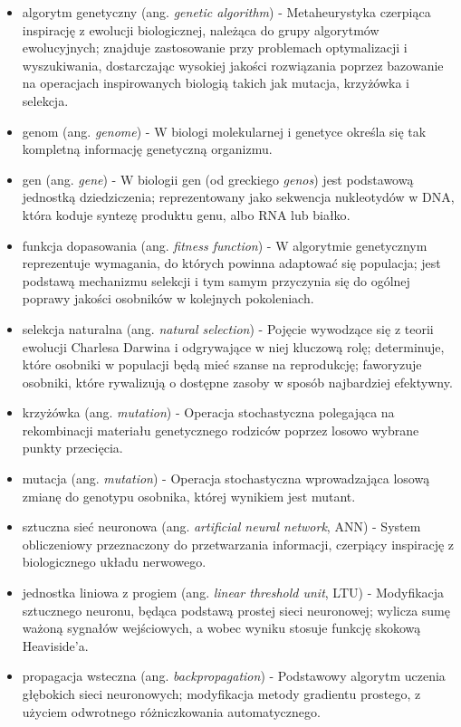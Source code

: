 \documentclass[a4paper,11pt]{article}
\begin{document}
    \begin{itemize}
        \item algorytm genetyczny (ang. \textit{genetic algorithm}) - Metaheurystyka czerpiąca inspirację z ewolucji biologicznej, należąca do grupy algorytmów ewolucyjnych; znajduje zastosowanie przy problemach optymalizacji i wyszukiwania, dostarczając wysokiej jakości rozwiązania poprzez bazowanie na operacjach inspirowanych biologią takich jak mutacja, krzyżówka i selekcja\cite{GeneticAlgorithmsMitchell1996}.
        \item genom (ang. \textit{genome}) - W biologi molekularnej i genetyce określa się tak kompletną informację genetyczną organizmu\cite{WhatIsGenomicMedicine2019}.
        \item gen (ang. \textit{gene}) - W biologii gen (od greckiego \textit{genos}) jest podstawową jednostką dziedziczenia; reprezentowany jako sekwencja nukleotydów w DNA, która koduje syntezę produktu genu, albo RNA lub białko\cite{GeneWiki}.
        \item funkcja dopasowania (ang. \textit{fitness function}) - W algorytmie genetycznym reprezentuje wymagania, do których powinna adaptować się populacja; jest podstawą mechanizmu selekcji i tym samym przyczynia się do ogólnej poprawy jakości osobników w kolejnych pokoleniach\cite{IntroductionToEvolutionaryComputing2015}.
        \item selekcja naturalna (ang. \textit{natural selection}) - Pojęcie wywodzące się z teorii ewolucji Charlesa Darwina i odgrywające w niej kluczową rolę; determinuje, które osobniki w populacji będą mieć szanse na reprodukcję; faworyzuje osobniki, które rywalizują o dostępne zasoby w sposób najbardziej efektywny\cite{IntroductionToEvolutionaryComputing2015}.
        \item krzyżówka (ang. \textit{mutation}) - Operacja stochastyczna polegająca na rekombinacji materiału genetycznego rodziców poprzez losowo wybrane punkty przecięcia\cite{IntroductionToEvolutionaryComputing2015}.
        \item mutacja (ang. \textit{mutation}) - Operacja stochastyczna wprowadzająca losową zmianę do genotypu osobnika, której wynikiem jest mutant\cite{IntroductionToEvolutionaryComputing2015}.
        \item sztuczna sieć neuronowa (ang. \textit{artificial neural network}, ANN) - System obliczeniowy przeznaczony do przetwarzania informacji, czerpiący inspirację z biologicznego układu nerwowego\cite{LeksykonSieciNeuronowych2015}.
        \item jednostka liniowa z progiem (ang. \textit{linear threshold unit}, LTU) - Modyfikacja sztucznego neuronu, będąca podstawą prostej sieci neuronowej; wylicza sumę ważoną sygnałów wejściowych, a wobec wyniku stosuje funkcję skokową Heaviside'a\cite{UczenieMaszynowe2018}.
        \item propagacja wsteczna (ang. \textit{backpropagation}) - Podstawowy algorytm uczenia głębokich sieci neuronowych; modyfikacja metody gradientu prostego, z użyciem odwrotnego różniczkowania automatycznego.
    \end{itemize}
\end{document}
